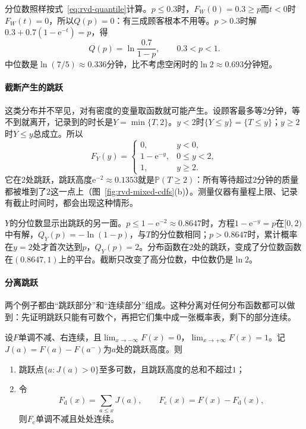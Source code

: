 分位数照样按式~\eqref{eq:rvd-quantile}计算。$p\leq0.3$时，$F_W(0)=0.3\geq p$而$t<0$时$F_W(t)=0$，所以$Q(p)=0$：有三成顾客根本不用等。$p>0.3$时解$0.3+0.7(1-\mathrm{e}^{-t})=p$，得
\[
  Q(p)=\ln\frac{0.7}{1-p},\qquad 0.3<p<1 .
\]
中位数是$\ln(7/5)\approx0.336$分钟，比不考虑空闲时的$\ln2\approx0.693$分钟短。

\paragraph{截断产生的跳跃}
这类分布并不罕见，对有密度的变量取函数就可能产生。设顾客最多等$2$分钟，等不到就离开，记录到的时长是$Y=\min\{T,2\}$。$y<2$时$\{Y\leq y\}=\{T\leq y\}$；$y\geq2$时$Y\leq y$总成立。所以
\[
  F_Y(y)=\begin{cases}0,&y<0,\\1-\mathrm{e}^{-y},&0\leq y<2,\\1,&y\geq2.\end{cases}
\]
它在$2$处跳跃，跳跃高度$\mathrm{e}^{-2}\approx0.1353$就是$\mathbb{P}(T\geq2)$：所有等待超过$2$分钟的质量都被堆到了$2$这一点上（图~\ref{fig:rvd-mixed-cdfs}(b)）。测量仪器有量程上限、记录有截止时间时，都会出现这种情形。

$Y$的分位数显示出跳跃的另一面。$p\leq1-\mathrm{e}^{-2}\approx0.8647$时，方程$1-\mathrm{e}^{-y}=p$在$[0,2)$中有解，$Q_Y(p)=-\ln(1-p)$，与$T$的分位数相同；$p>0.8647$时，累计概率在$y=2$处才首次达到$p$，$Q_Y(p)=2$。分布函数在$2$处的跳跃，变成了分位数函数在$(0.8647,1)$上的平台。截断只改变了高分位数，中位数仍是$\ln2$。

\paragraph{分离跳跃}
两个例子都由“跳跃部分”和“连续部分”组成。这种分离对任何分布函数都可以做到：先证明跳跃只能有可数个，再把它们集中成一张概率表，剩下的部分连续。

\begin{theorem}[分布函数的跳跃分解]
\label{thm:rvd-jump-decomposition}
设$F$单调不减、右连续，且$\lim_{x\to-\infty}F(x)=0$，$\lim_{x\to+\infty}F(x)=1$。记$J(a)=F(a)-F(a^{-})$为$a$处的跳跃高度。则
\begin{enumerate}
  \item 跳跃点$\{a:J(a)>0\}$至多可数，且跳跃高度的总和不超过$1$；
  \item 令
  \begin{equation}
    F_{\mathrm{d}}(x)=\sum_{a\leq x}J(a),\qquad F_{\mathrm{c}}(x)=F(x)-F_{\mathrm{d}}(x),
    \label{eq:rvd-jump-parts}
  \end{equation}
  则$F_{\mathrm{c}}$单调不减且处处连续。
\end{enumerate}
\end{theorem}

